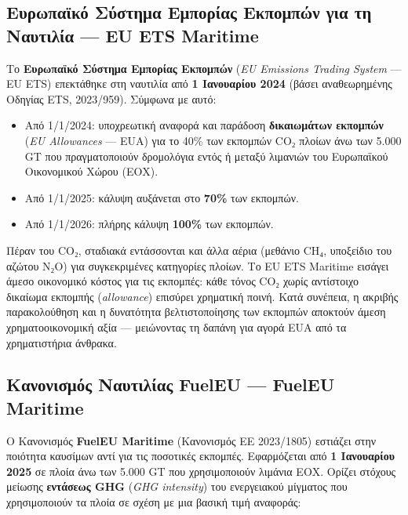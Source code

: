 \documentclass[11pt,a4paper,greek,twoside]{template-xe}
\providecommand{\tightlist}{\setlength{\itemsep}{0pt}\setlength{\parskip}{0pt}}
\begin{document}
\subsection{Ευρωπαϊκό Σύστημα Εμπορίας Εκπομπών για τη Ναυτιλία --- EU
ETS
Maritime}\label{ux3b5ux3c5ux3c1ux3c9ux3c0ux3b1ux3caux3baux3cc-ux3c3ux3cdux3c3ux3c4ux3b7ux3bcux3b1-ux3b5ux3bcux3c0ux3bfux3c1ux3afux3b1ux3c2-ux3b5ux3baux3c0ux3bfux3bcux3c0ux3ceux3bd-ux3b3ux3b9ux3b1-ux3c4ux3b7-ux3bdux3b1ux3c5ux3c4ux3b9ux3bbux3afux3b1-eu-ets-maritime}

Το \textbf{Ευρωπαϊκό Σύστημα Εμπορίας Εκπομπών} (\emph{EU Emissions
Trading System} --- EU ETS) επεκτάθηκε στη ναυτιλία από \textbf{1
Ιανουαρίου 2024} (βάσει αναθεωρημένης Οδηγίας ETS, 2023/959). Σύμφωνα με
αυτό:

\begin{itemize}
\tightlist
\item
  Από 1/1/2024: υποχρεωτική αναφορά και παράδοση \textbf{δικαιωμάτων
  εκπομπών} (\emph{EU Allowances} --- EUA) για το 40\% των εκπομπών CO₂
  πλοίων άνω των 5.000 GT που πραγματοποιούν δρομολόγια εντός ή μεταξύ
  λιμανιών του Ευρωπαϊκού Οικονομικού Χώρου (ΕΟΧ).
\item
  Από 1/1/2025: κάλυψη αυξάνεται στο \textbf{70\%} των εκπομπών.
\item
  Από 1/1/2026: πλήρης κάλυψη \textbf{100\%} των εκπομπών.
\end{itemize}

Πέραν του CO₂, σταδιακά εντάσσονται και άλλα αέρια (μεθάνιο CH₄,
υποξείδιο του αζώτου N₂O) για συγκεκριμένες κατηγορίες πλοίων. Το EU ETS
Maritime εισάγει άμεσο οικονομικό κόστος για τις εκπομπές: κάθε τόνος
CO₂ χωρίς αντίστοιχο δικαίωμα εκπομπής (\emph{allowance}) επισύρει
χρηματική ποινή. Κατά συνέπεια, η ακριβής παρακολούθηση και η δυνατότητα
βελτιστοποίησης των εκπομπών αποκτούν άμεση χρηματοοικονομική αξία ---
μειώνοντας τη δαπάνη για αγορά EUA από τα χρηματιστήρια άνθρακα.

\subsection{Κανονισμός Ναυτιλίας FuelEU --- FuelEU
Maritime}\label{ux3baux3b1ux3bdux3bfux3bdux3b9ux3c3ux3bcux3ccux3c2-ux3bdux3b1ux3c5ux3c4ux3b9ux3bbux3afux3b1ux3c2-fueleu-fueleu-maritime}

Ο Κανονισμός \textbf{FuelEU Maritime} (Κανονισμός ΕΕ 2023/1805) εστιάζει
στην ποιότητα καυσίμων αντί για τις ποσοτικές εκπομπές. Εφαρμόζεται από
\textbf{1 Ιανουαρίου 2025} σε πλοία άνω των 5.000 GT που χρησιμοποιούν
λιμάνια ΕΟΧ. Ορίζει στόχους μείωσης \textbf{εντάσεως GHG} (\emph{GHG
intensity}) του ενεργειακού μίγματος που χρησιμοποιούν τα πλοία σε σχέση
με μια βασική τιμή αναφοράς:
\end{document}
